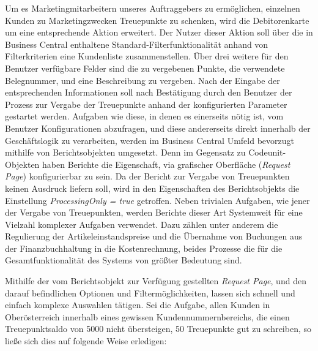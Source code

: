 Um es Marketingmitarbeitern unseres Auftraggebers zu ermöglichen, einzelnen Kunden zu Marketingzwecken Treuepunkte zu schenken, wird die Debitorenkarte um eine entsprechende Aktion erweitert. Der Nutzer dieser Aktion soll über die in Business Central enthaltene Standard-Filterfunktionalität anhand von Filterkriterien eine Kundenliste zusammenstellen. Über drei weitere für den Benutzer verfügbare Felder sind die zu vergebenen Punkte, die verwendete Belegnummer, und eine Beschreibung zu vergeben. Nach der Eingabe der entsprechenden Informationen soll nach Bestätigung durch den Benutzer der Prozess zur Vergabe der Treuepunkte anhand der konfigurierten Parameter gestartet werden. Aufgaben wie diese, in denen es einerseits nötig ist, vom Benutzer Konfigurationen abzufragen, und diese andererseits direkt innerhalb der Geschäftslogik zu verarbeiten, werden im Business Central Umfeld bevorzugt mithilfe von Berichtsobjekten umgesetzt. Denn im Gegensatz zu Codeunit-Objekten haben Berichte die Eigenschaft, via grafischer Oberfläche (\textit{Request Page}) konfigurierbar zu sein. Da der Bericht zur Vergabe von Treuepunkten keinen Ausdruck liefern soll, wird in den Eigenschaften des Berichtsobjekts die Einstellung \textit{ProcessingOnly = true} getroffen. Neben trivialen Aufgaben, wie jener der Vergabe von Treuepunkten, werden Berichte dieser Art Systemweit für eine Vielzahl komplexer Aufgaben verwendet. Dazu zählen unter anderem die Regulierung der Artikeleinstandspreise und die Übernahme von Buchungen aus der Finanzbuchhaltung in die Kostenrechnung, beides Prozesse die für die Gesamtfunktionalität des Systems von größter Bedeutung sind.
\linebreak

Mithilfe der vom Berichtsobjekt zur Verfügung gestellten \textit{Request Page}, und den darauf befindlichen Optionen und Filtermöglichkeiten, lassen sich schnell und einfach komplexe Auswahlen tätigen. Sei die Aufgabe, allen Kunden in Oberösterreich innerhalb eines gewissen Kundennummernbereichs, die einen Treuepunktsaldo von 5000 nicht übersteigen, 50 Treuepunkte gut zu schreiben, so ließe sich dies auf folgende Weise erledigen:

